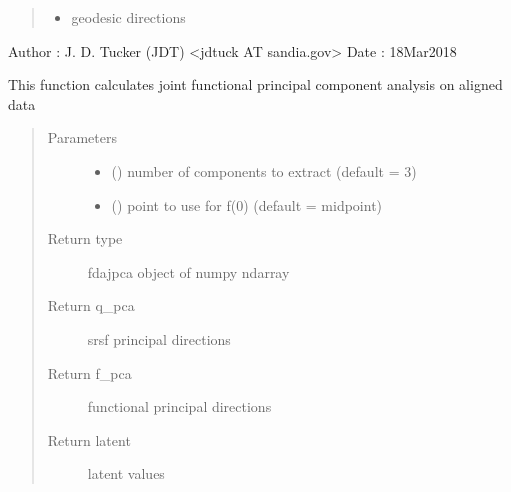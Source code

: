 \documentclass[letterpaper,10pt,english]{sphinxmanual}
\begin{document}
\begin{fulllineitems}
\begin{quote}
\begin{description}
\begin{itemize}
\item {} 
 \textendash{} geodesic directions

\end{itemize}

\end{description}\end{quote}

Author :  J. D. Tucker (JDT) \textless{}jdtuck AT sandia.gov\textgreater{}
Date   :  18\sphinxhyphen{}Mar\sphinxhyphen{}2018

\begin{fulllineitems}
\label{\detokenize{fPCA:fPCA.fdajpca.calc_fpca}}
This function calculates joint functional principal component analysis
on aligned data
\begin{quote}\begin{description}
\item[{Parameters}] \leavevmode\begin{itemize}
\item {} 
 () \textendash{} number of components to extract (default = 3)

\item {} 
 () \textendash{} point to use for f(0) (default = midpoint)

\end{itemize}

\item[{Return type}] \leavevmode
fdajpca object of numpy ndarray

\item[{Return q\_pca}] \leavevmode
srsf principal directions

\item[{Return f\_pca}] \leavevmode
functional principal directions

\item[{Return latent}] \leavevmode
latent values


\end{description}
\end{quote}
\end{fulllineitems}
\end{fulllineitems}
\end{document}
